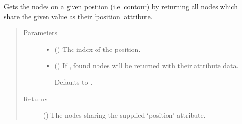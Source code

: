 \documentclass[letterpaper,10pt,english]{sphinxmanual}
\begin{document}
\begin{fulllineitems}

\begin{fulllineitems}
\label{\detokenize{cockatoo:cockatoo.KnitNetworkBase.nodes_on_position}}
Gets the nodes on a given position (i.e. contour) by returning all
nodes which share the given value as their ‘position’ attribute.
\begin{quote}\begin{description}
\item[{Parameters}] \leavevmode\begin{itemize}
\item {} 
 () \textendash{} The index of the position.

\item {} 
 (\sphinxstyleliteralemphasis{\sphinxupquote{, }}) \textendash{} 
If , found nodes will be returned with their attribute
data.

Defaults to .


\end{itemize}

\item[{Returns}] \leavevmode
{} () \textendash{} The nodes sharing the supplied ‘position’ attribute.

\end{description}\end{quote}

\end{fulllineitems}



\end{fulllineitems}
\end{document}
